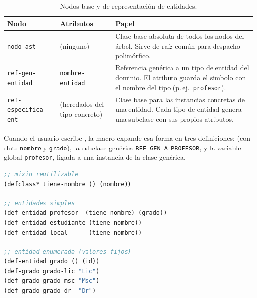 \documentclass[12pt,a4paper]{report}
\begin{document}

\begin{table}[h!]
\centering
\caption{Nodos base y de representación de entidades.}
\label{tab:nodos-base}
\renewcommand{\arraystretch}{1.3}
\begin{tabular}{p{4.8cm} p{4.5cm} p{5.5cm}}
\hline
\textbf{Nodo} & \textbf{Atributos} & \textbf{Papel} \\
\hline
\texttt{nodo-ast}
  & (ninguno)
  & Clase base absoluta de todos los nodos del árbol. Sirve
    de raíz común para despacho polimórfico. \\
\hline
\texttt{ref-gen-entidad}
  & \texttt{nombre-entidad}
  & Referencia genérica a un tipo de entidad del dominio.
    El atributo guarda el símbolo con el nombre del tipo
    (p.\,ej.\ \texttt{profesor}). \\
\hline
\texttt{ref-especifica-ent}
  & (heredados del tipo concreto)
  & Clase base para las instancias concretas de una entidad.
    Cada tipo de entidad genera una subclase con sus propios
    atributos. \\
\hline
\end{tabular}
\end{table}

\medskip
\noindent
Cuando el usuario escribe , la macro expande esa forma en tres
definiciones:  (con
slots \texttt{nombre} y \texttt{grado}), la subclase genérica
\texttt{REF-GEN-A-PROFESOR}, y la variable global \texttt{profesor},
ligada a una instancia de la clase genérica.

\begin{lstlisting}[language=CommonLisp, caption={Definicion de entidades del dominio.}]
;; mixin reutilizable
(defclass* tiene-nombre () (nombre))

;; entidades simples
(def-entidad profesor  (tiene-nombre) (grado))
(def-entidad estudiante (tiene-nombre))
(def-entidad local      (tiene-nombre))

;; entidad enumerada (valores fijos)
(def-entidad grado () (id))
(def-grado grado-lic "Lic")
(def-grado grado-msc "Msc")
(def-grado grado-dr  "Dr")
\end{lstlisting}
\end{document}
